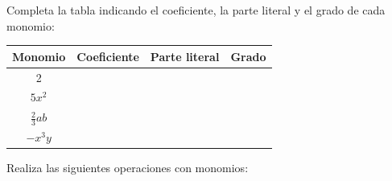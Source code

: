 \documentclass[addpoints,spanish, 12pt,a4paper]{exam}
\begin{document}
\begin{questions}



\question[1]
Completa la tabla indicando el coeficiente, la parte literal y el grado de cada monomio:
\vspace{10pt}

\begin{tabular}{|c|c|c|c|}
\hline
\textbf{Monomio} & \textbf{Coeficiente} & \textbf{Parte literal} & \textbf{Grado} \\
\hline
2 & & & \\
\hline
$5x^2$ & & & \\
\hline
$\frac{2}{3}ab$ & & & \\
\hline
$-x^3y$ & & & \\
\hline
\end{tabular}



\question[1]
Realiza las siguientes operaciones con monomios:
\begin{multicols}{2}
\begin{parts}

\end{parts}
\end{multicols}
\end{questions}
\end{document}
